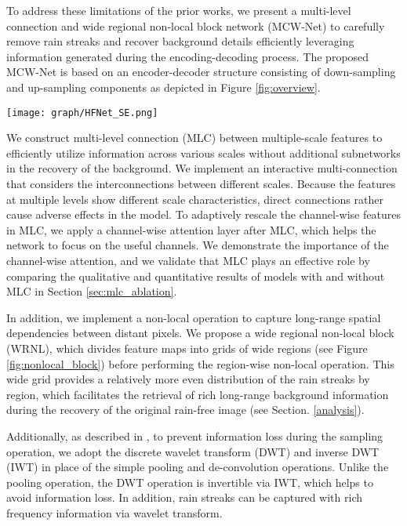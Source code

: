 \documentclass[a4paper,fleqn]{cas-dc}
\begin{document}
To address these limitations of the prior works, we present a multi-level connection and wide regional non-local block network (MCW-Net) to carefully remove rain streaks and recover background details efficiently leveraging information generated during the encoding-decoding process.
The proposed MCW-Net is based on an encoder-decoder structure consisting of down-sampling and up-sampling components as depicted in Figure \ref{fig:overview}. 


\begin{figure*}[!t]
	\centering\texttt{[image: graph/HFNet\_SE.png]}\\
	\caption{Overview of the proposed MCW-Net structure.}

	\label{fig:overview}
\end{figure*}

We construct multi-level connection (MLC) between multiple-scale features to efficiently utilize information across various scales without additional subnetworks in the recovery of the background. We implement an interactive multi-connection that considers the interconnections between different scales. Because the features at multiple levels show different scale characteristics, direct connections rather cause adverse effects in the model. To adaptively rescale the channel-wise features in MLC, we apply a channel-wise attention layer \cite{hu2018squeeze} after MLC, which helps the network to focus on the useful channels. We demonstrate the importance of the channel-wise attention, and we validate that MLC plays an effective role by comparing the qualitative and quantitative results of models with and without MLC in Section \ref{sec:mlc_ablation}.


In addition, we implement a non-local operation \cite{NonLocal2018} to capture long-range spatial dependencies between distant pixels. We propose a wide regional non-local block (WRNL), which divides feature maps into grids of wide regions (see Figure \ref{fig:nonlocal_block}) before performing the region-wise non-local operation. This wide grid provides a relatively more even distribution of the rain streaks by region, which facilitates the retrieval of rich long-range background information during the recovery of the original rain-free image (see Section. \ref{analysis}).

Additionally, as described in \cite{yang2019scale}, to prevent information loss during the sampling operation, we adopt the discrete wavelet transform (DWT) and inverse DWT (IWT) in place of the simple pooling and de-convolution operations. Unlike the pooling operation, the DWT operation is invertible via IWT, which helps to avoid information loss. In addition, rain streaks can be captured with rich frequency information via wavelet transform.
 
\end{document}

